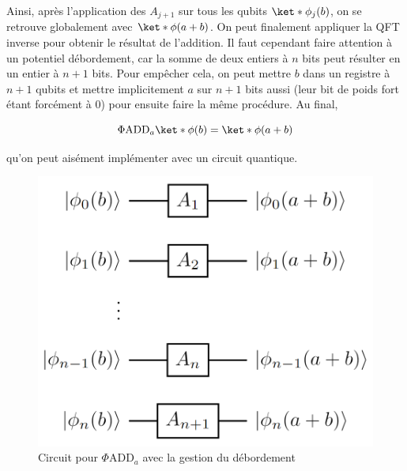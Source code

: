 Ainsi, après l'application des $A_{j+1}$ sur tous les qubits $\ket*{\phi_j(b)}$, on se retrouve globalement avec $\ket*{\phi(a+b)}$. On peut finalement appliquer la QFT inverse pour obtenir le résultat de l'addition. Il faut cependant faire attention à un potentiel débordement, car la somme de deux entiers à $n$ bits peut résulter en un entier à $n+1$ bits. Pour empêcher cela, on peut mettre $b$ dans un registre à $n+1$ qubits et mettre implicitement $a$ sur $n+1$ bits aussi (leur bit de poids fort étant forcément à 0) pour ensuite faire la même procédure. Au final,

\begin{equation}
    \Phi \text{ADD}_a \ket*{\phi(b)} = \ket*{\phi(a+b)}
\end{equation}

qu'on peut aisément implémenter avec un circuit quantique.

\begin{figure}[H]
    \centering
    \includegraphics[scale=0.42]{images/phiadd.png} 
    \caption{Circuit pour $\Phi$ADD$_a$ avec la gestion du débordement}
\end{figure}

